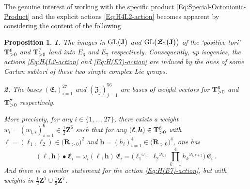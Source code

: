 \documentclass[11pt]{amsart}
\newcommand{\sk}{\smallskip}
\newtheorem{prop}[thm]{Proposition}
\begin{document}
The genuine interest of working with the specific product \eqref{Eq:Special-Octonionic-Product} and the explicit actions 
 \eqref{Eq:H4L2-action} becomes apparent by considering the 
  content of the following 
\begin{prop}%
{\bf 1.} The images in ${\rm GL}\big( \mathbf J\big)$  and 
${\rm GL}\big( \boldsymbol{\mathcal Z}_2\big(\mathbf J\big)\big)$ 
of the `positive tori' ${\bf T}_{>0}^6$ and 
${\bf T}_{>0}^7$ land into $E_6$ and $E_7$ respectively. Consequently, 
up isogenies, the actions 
\eqref{Eq:H4L2-action} 
and 
\eqref{Eq:H(E7)-action} are induced by the ones of some Cartan subtori of these two simple complex Lie groups.
\sk

\noindent 
{\bf 2.} The bases $(\mathfrak E_i)_{i=1}^{27}$ and $(\mathfrak Z_j)_{j=1}^{56}$  are bases of weight vectors for ${\bf T}_{>0}^6$ and 
${\bf T}_{>0}^7$ respectively.  

More precisely, for any $i\in \{1,\ldots,27\}$, 
there exists a weight $w_i=(w_{i,s})_{s=1}^6 \in \frac{1}{2}\mathbf Z^6$ such that for any 
$(\boldsymbol{\ell},\boldsymbol{h})\in {\bf T}_{>0}^6$ with $
\boldsymbol{\ell}=(\ell_1,\ell_2)\in \big( \mathbf R_{>0}\big)^2$ and $ 
\boldsymbol{h}=(h_i)_{i=1}^4\in \big( \mathbf R_{>0}\big)^4$, one has 
$$
(\boldsymbol{\ell},\boldsymbol{h})\bullet \mathfrak E_i= 
\omega_i(\boldsymbol{\ell},\boldsymbol{h} ) \,\mathfrak E_i=
\Big({\ell_1}^{\omega_{i,1}}
{\ell_2}^{\omega_{i,2}}
\prod_{k=1}^4 {h_k}^{\omega_{i,k+2}}\Big)
\, 
\mathfrak E_i \, . 
$$
And there is a similar statement for the action \eqref{Eq:H(E7)-action}, but with weights in $\frac{1}{2}\mathbf Z^7\cup \frac{1}{3}\mathbf Z^7$. 
\end{prop}%
 
\end{document}
